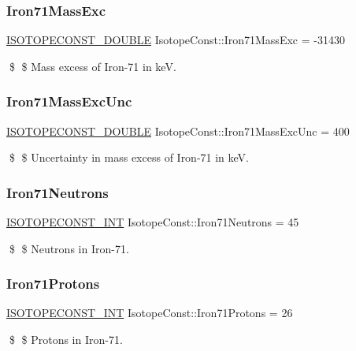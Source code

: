 \subsubsection{\texorpdfstring{Iron71\+Mass\+Exc}{Iron71MassExc}}
{\footnotesize\ttfamily \mbox{\hyperlink{group___isotope_const-_macros_ga8f45a7272ce02c0b4c65c44636ed719a}{I\+S\+O\+T\+O\+P\+E\+C\+O\+N\+S\+T\+\_\+\+D\+O\+U\+B\+LE}} Isotope\+Const\+::\+Iron71\+Mass\+Exc = -\/31430}

\$ \$ Mass excess of Iron-\/71 in keV. \mbox{\label{group___isotope_const-_iron-_fe71_ga222dffc60a46a9fedb1e9046a21a53c9}} 
\subsubsection{\texorpdfstring{Iron71\+Mass\+Exc\+Unc}{Iron71MassExcUnc}}
{\footnotesize\ttfamily \mbox{\hyperlink{group___isotope_const-_macros_ga8f45a7272ce02c0b4c65c44636ed719a}{I\+S\+O\+T\+O\+P\+E\+C\+O\+N\+S\+T\+\_\+\+D\+O\+U\+B\+LE}} Isotope\+Const\+::\+Iron71\+Mass\+Exc\+Unc = 400}

\$ \$ Uncertainty in mass excess of Iron-\/71 in keV. \mbox{\label{group___isotope_const-_iron-_fe71_ga68a3670bb02cc0b198e5baae7db71d6c}} 
\subsubsection{\texorpdfstring{Iron71\+Neutrons}{Iron71Neutrons}}
{\footnotesize\ttfamily \mbox{\hyperlink{group___isotope_const-_macros_ga5f18360b3e99483a35c32d789e62621c}{I\+S\+O\+T\+O\+P\+E\+C\+O\+N\+S\+T\+\_\+\+I\+NT}} Isotope\+Const\+::\+Iron71\+Neutrons = 45}

\$ \$ Neutrons in Iron-\/71. \mbox{\label{group___isotope_const-_iron-_fe71_gaed7dd4adbe5ab34cea597bccb1f4f23f}} 
\subsubsection{\texorpdfstring{Iron71\+Protons}{Iron71Protons}}
{\footnotesize\ttfamily \mbox{\hyperlink{group___isotope_const-_macros_ga5f18360b3e99483a35c32d789e62621c}{I\+S\+O\+T\+O\+P\+E\+C\+O\+N\+S\+T\+\_\+\+I\+NT}} Isotope\+Const\+::\+Iron71\+Protons = 26}

\$ \$ Protons in Iron-\/71. 